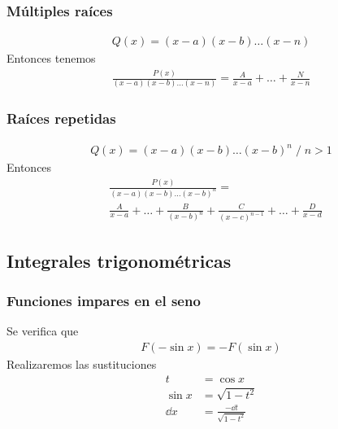 \documentclass{article}
\begin{document}
\subsubsection{Múltiples raíces}
\begin{equation}
    \begin{split}
        Q(x)= (x-a)(x-b)\dots (x-n)
    \end{split}
\end{equation}
Entonces tenemos
\begin{equation}
    \begin{split}
        \frac{P(x)}{(x-a)(x-b)\dots (x-n)} = \frac{A}{x-a} + \dots + \frac{N}{x-n}
    \end{split}
\end{equation}
\subsubsection{Raíces repetidas}
\begin{equation}
    \begin{split}
        Q(x) = (x-a)(x-b)\dots (x-b)^{n} \; / \; n>1
    \end{split}
\end{equation}
Entonces
\begin{equation}
    \begin{split}
        &\frac{P(x)}{(x-a)(x-b)\dots (x-b)^{n}} = \\
        &\frac{A}{x-a}+\dots + \frac{B}{(x-b)^n}
        + \frac{C}{(x-c)^{n-1}}+\dots + \frac{D}{x-d}
    \end{split}
\end{equation}
\subsection{Integrales trigonométricas}
\subsubsection{Funciones impares en el seno}
Se verifica que
\begin{equation}
    \begin{split}
        F(-\sin x) = -F(\sin x)
    \end{split}
\end{equation}
Realizaremos las sustituciones
\begin{equation}
    \begin{split}
        t &= \cos x\\
        \sin x &= \sqrt{1-t^{2}}\\
        \dd{x} &= \frac{- \dd{t}}{\sqrt{1-t^{2}}}
    \end{split}
\end{equation}
\end{document}

